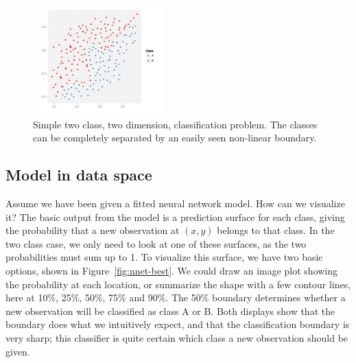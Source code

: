 \documentclass[preprint]{imsart}
\begin{document}
\begin{figure}[htbp]
  \centering
    \includegraphics[width=0.45\textwidth]{nnet-test}
  \caption{Simple two class, two dimension, classification problem.  The classes can be completely separated by an easily seen non-linear boundary.}
  \label{fig:nnet-test}
\end{figure}

\subsection{Model in data space}
\label{sub:minds}

Assume we have been given a fitted neural network model.  How can we visualize it?  The basic output from the model is a prediction surface for each class, giving the probability that a new observation at $(x, y)$ belongs to that class.  In the two class case, we only need to look at one of these surfaces, as the two probabilities must sum up to 1.  To visualize this surface, we have two basic options, shown in Figure~\ref{fig:nnet-best}. We could draw an image plot showing the probability at each location, or summarize the shape with a few contour lines, here at 10\%, 25\%, 50\%, 75\% and 90\%.  The 50\% boundary determines whether a new observation will be classified as class A or B.  Both displays show that the boundary does what we intuitively expect, and that the classification boundary is very sharp; this classifier is quite certain which class a new observation should be given.
\end{document}
